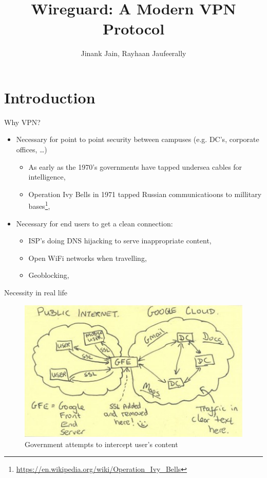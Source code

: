 \documentclass{beamer}
\title{Wireguard: A Modern VPN Protocol}
\author{Jinank Jain, Rayhaan Jaufeerally}
\institute{ETH Z\"urich}
\begin{document}
    \maketitle
    \section{Introduction}
    \begin{frame}{Why VPN?}
        \begin{itemize}
            \item Necessary for point to point security between campuses (e.g. DC's, corporate offices, \ldots)
                \begin{itemize}
                    \item As early as the 1970's governments have tapped undersea cables for intelligence,
                    \item Operation Ivy Bells in 1971 tapped Russian communicatioons to millitary bases\footnote{\url{https://en.wikipedia.org/wiki/Operation\_Ivy\_Bells}},
                \end{itemize}
            \item Necessary for end users to get a clean connection:
                \begin{itemize}
                    \item ISP's doing DNS hijacking to serve inappropriate content,
                    \item Open WiFi networks when travelling,
                    \item Geoblocking,
                \end{itemize}
        \end{itemize}
    \end{frame}
    \begin{frame}{Necessity in real life}
        \begin{figure}
            \includegraphics[width=\textwidth]{motivation.jpg}
            \caption{Government attempts to intercept user's content}
        \end{figure}
    \end{frame}
\end{document}
